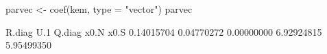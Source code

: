 \begin{Schunk}
\begin{Sinput}
 parvec <- coef(kem, type = "vector")
 parvec
\end{Sinput}
\begin{Soutput}
    R.diag        U.1     Q.diag       x0.N       x0.S 
0.14015704 0.04770272 0.00000000 6.92924815 5.95499350 
\end{Soutput}
\end{Schunk}
